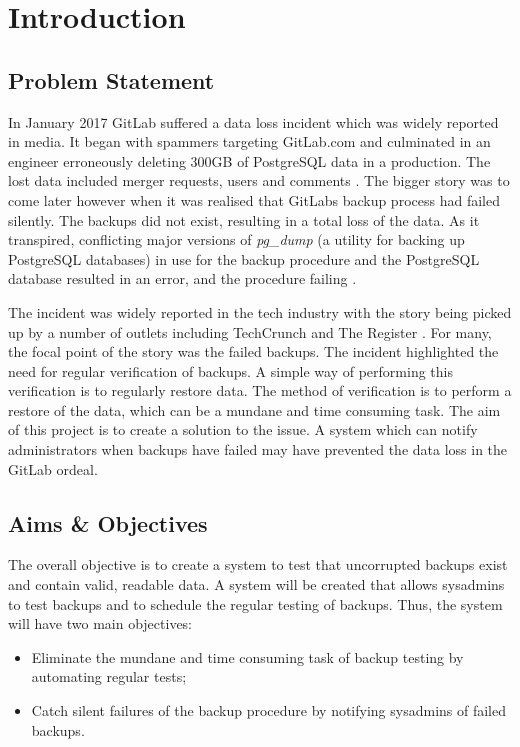 \section{Introduction}

\subsection{Problem Statement}
In January 2017 GitLab suffered a data loss incident which was widely reported in media. It began with spammers targeting GitLab.com and culminated in an engineer erroneously deleting 300GB of PostgreSQL data in a production. The lost data included merger requests, users and comments \citep{gitlab1}. The bigger story was to come later however when it was realised that GitLabs backup process had failed silently. The backups did not exist, resulting in a total loss of the data. As it transpired, conflicting major versions of \textit{pg\_dump} (a utility for backing up PostgreSQL databases) in use for the backup procedure and the PostgreSQL database resulted in an error, and the procedure failing \citep{gitlab2}.

The incident was widely reported in the tech industry with the story being picked up by a number of outlets including TechCrunch \citeyearpar{lomas} and The Register \citeyearpar{sharwood}. For many, the focal point of the story was the failed backups. The incident highlighted the need for regular verification of backups. A simple way of performing this verification is to regularly restore data. The method of verification is to perform a restore of the data, which can be a mundane and time consuming task. The aim of this project is to create a solution to the issue. A system which can notify administrators when backups have failed may have prevented the data loss in the GitLab ordeal.

\subsection{Aims \& Objectives}
The overall objective is to create a system to test that uncorrupted backups exist and contain valid, readable data. A system will be created that allows sysadmins to test backups and to schedule the regular testing of backups. Thus, the system will have two main objectives:
% 
% 
\begin{itemize}
	\item Eliminate the mundane and time consuming task of backup testing by automating regular tests;
	\item Catch silent failures of the backup procedure by notifying sysadmins of failed backups.
\end{itemize}

